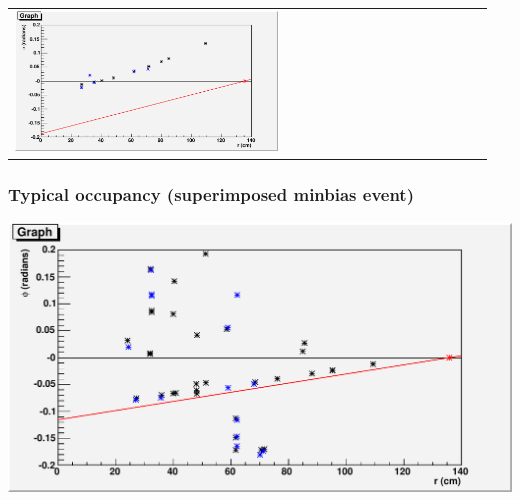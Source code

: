 \documentclass[12pt,compress]{beamer}
\begin{document}
\begin{frame}
\begin{center}
\begin{tabular}{p{0.55\linewidth} p{0.4\linewidth}}
\begin{minipage}{\linewidth} \includegraphics[width=\linewidth]{event_display_wrongsc} \end{minipage} \\
\end{tabular}
\end{center}

\end{frame}

\begin{frame}
\frametitle{Typical occupancy (superimposed minbias event)}

\begin{center}
\includegraphics[width=\linewidth]{event_display_superimposed}
\end{center}
\end{frame}
\end{document}
